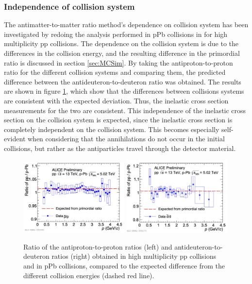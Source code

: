\subsubsection{Independence of collision system}
The antimatter-to-matter ratio method's dependence on collision system has been investigated by redoing the analysis performed in pPb collisions in \cite{antideuteronXS} for high multiplicity pp collisions. The dependence on the collision system is due to the differences in the collision energy, and the resulting difference in the primordial ratio is discussed in section \ref{sec:MCSim}. By taking the antiproton-to-proton ratio for the different collision systems and comparing them, the predicted difference between the antideuteron-to-deuteron ratio was obtained. The results are shown in figure \ref{fig:pp_pPb_dbardRatio}, which show that the differences between collisions systems are consistent with the expected deviation. Thus, the inelastic cross section measurements for the two are consistent. This independence of the inelastic cross section on the collision system is expected, since the inelastic cross section is completely independent on the collision system. This becomes especially self-evident when considering that the annihilations do not occur in the initial collisions, but rather as the antiparticles travel through the detector material.

\begin{figure}
    \centering
    \includegraphics[width=0.49\textwidth]{figures/antiproton-to-proton-ratio-pp-pPb-comparison.png}
    \includegraphics[width=0.49\textwidth]{figures/antideuteron-to-deuteron-ratio-comparison-pp-pPb.png}
    \caption{Ratio of the antiproton-to-proton ratios (left) and antideuteron-to-deuteron ratios (right) obtained in high multiplicity pp collisions and in pPb collisions, compared to the expected difference from the different collision energies (dashed red line).}
    \label{fig:pp_pPb_dbardRatio}
\end{figure}

